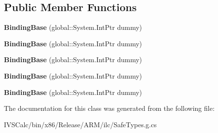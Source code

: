 \subsection*{Public Member Functions}
\begin{DoxyCompactItemize}
\item 
\mbox{\label{class_windows_1_1_u_i_1_1_xaml_1_1_data_1_1_binding_base_aa05ba4890a3345c4537ad0978083e08c}} 
{\bfseries Binding\+Base} (global\+::\+System.\+Int\+Ptr dummy)
\item 
\mbox{\label{class_windows_1_1_u_i_1_1_xaml_1_1_data_1_1_binding_base_aa05ba4890a3345c4537ad0978083e08c}} 
{\bfseries Binding\+Base} (global\+::\+System.\+Int\+Ptr dummy)
\item 
\mbox{\label{class_windows_1_1_u_i_1_1_xaml_1_1_data_1_1_binding_base_aa05ba4890a3345c4537ad0978083e08c}} 
{\bfseries Binding\+Base} (global\+::\+System.\+Int\+Ptr dummy)
\item 
\mbox{\label{class_windows_1_1_u_i_1_1_xaml_1_1_data_1_1_binding_base_aa05ba4890a3345c4537ad0978083e08c}} 
{\bfseries Binding\+Base} (global\+::\+System.\+Int\+Ptr dummy)
\item 
\mbox{\label{class_windows_1_1_u_i_1_1_xaml_1_1_data_1_1_binding_base_aa05ba4890a3345c4537ad0978083e08c}} 
{\bfseries Binding\+Base} (global\+::\+System.\+Int\+Ptr dummy)
\end{DoxyCompactItemize}


The documentation for this class was generated from the following file\+:\begin{DoxyCompactItemize}
\item 
I\+V\+S\+Calc/bin/x86/\+Release/\+A\+R\+M/ilc/Safe\+Types.\+g.\+cs\end{DoxyCompactItemize}
